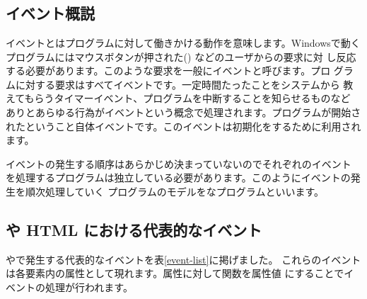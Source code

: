 \section{}
\subsection{イベント概説}
イベントとはプログラムに対して働きかける動作を意味します。Windowsで動く
プログラムにはマウスボタンが押された()
などのユーザからの要求に対
し反応する必要があります。このような要求を一般にイベントと呼びます。プロ
グラムに対する要求はすべてイベントです。一定時間たったことをシステムから
教えてもらうタイマーイベント、プログラムを中断することを知らせるものなど
ありとあらゆる行為がイベントという概念で処理されます。プログラムが開始さ
れたということ自体イベントです。このイベントは初期化をするために利用され
ます。

イベントの発生する順序はあらかじめ決まっていないのでそれぞれのイベント
を処理するプログラムは独立している必要があります。このようにイベントの発
生を順次処理していく
プログラムのモデルをなプログラムといいます。
\subsection{\SVG や HTML における代表的なイベント}
\SVG や\HTML で発生する代表的なイベントを表\ref{event-list}に掲げました。
これらのイベントは各要素内の属性として現れます。属性に対して関数を属性値
にすることでイベントの処理が行われます。
\iffalse
イベントの情報は残念ながら\IE と
\FF や \Opera では異なっています。すべてのブラウザに対して動くようなコー
ドを書くこともできます(クロスブラウザ対策とよばれます)が、後で別の
方法でこれらのイベントを処理する方法を解説します。したがって、この形で処
理されるイベントは原則としてSVGのファイルがロードされた後に発生する
\Event{onload}だけにします。\footnote{\Event{onload}も属性として書かない
方法もあります。}
\fi

